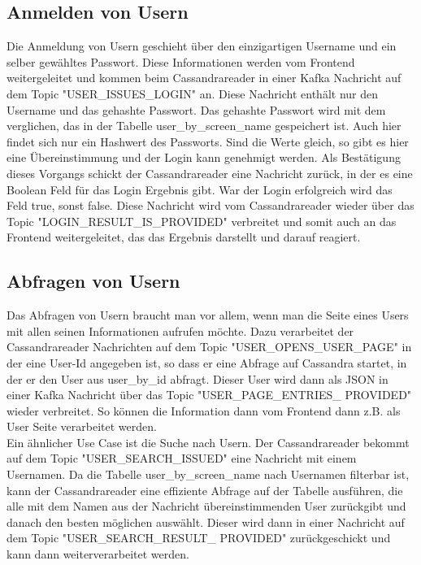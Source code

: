 \subsection{Anmelden von Usern}
Die Anmeldung von Usern geschieht über den einzigartigen Username und ein selber gewähltes Passwort. Diese Informationen werden vom Frontend weitergeleitet und kommen beim Cassandrareader in einer Kafka Nachricht auf dem Topic "USER\_ISSUES\_LOGIN" an. Diese Nachricht enthält nur den Username und das gehashte Passwort. Das gehashte Passwort wird mit dem verglichen, das in der Tabelle user\_by\_screen\_name gespeichert ist. Auch hier findet sich nur ein Hashwert des Passworts. Sind die Werte gleich, so gibt es hier eine Übereinstimmung und der Login kann genehmigt werden. Als Bestätigung dieses Vorgangs schickt der Cassandrareader eine Nachricht zurück, in der es eine Boolean Feld für das Login Ergebnis gibt. War der Login erfolgreich wird das Feld true, sonst false. Diese Nachricht wird vom Cassandrareader wieder über das Topic "LOGIN\_RESULT\_IS\_PROVIDED" verbreitet und somit auch an das Frontend weitergeleitet, das das Ergebnis darstellt und darauf reagiert.

\subsection{Abfragen von Usern}
\label{subsec:Userabfrage}
Das Abfragen von Usern braucht man vor allem, wenn man die Seite eines Users mit allen seinen Informationen aufrufen möchte. Dazu verarbeitet der Cassandrareader Nachrichten auf dem Topic "USER\_OPENS\_USER\_PAGE" in der eine User-Id angegeben ist, so dass er eine Abfrage auf Cassandra startet, in der er den User aus user\_by\_id abfragt. Dieser User wird dann als JSON in einer Kafka Nachricht über das Topic "USER\_PAGE\_ENTRIES\_ PROVIDED" wieder verbreitet. So können die Information dann vom Frontend dann z.B. als User Seite verarbeitet werden.\\
Ein ähnlicher Use Case ist die Suche nach Usern. Der Cassandrareader bekommt auf dem Topic "USER\_SEARCH\_ISSUED" eine Nachricht mit einem Usernamen. Da die Tabelle user\_by\_screen\_name nach Usernamen filterbar ist, kann der Cassandrareader eine effiziente Abfrage auf der Tabelle ausführen, die alle mit dem Namen aus der Nachricht übereinstimmenden User zurückgibt und danach den besten möglichen auswählt. Dieser wird dann in einer Nachricht auf dem Topic "USER\_SEARCH\_RESULT\_ PROVIDED" zurückgeschickt und kann dann weiterverarbeitet werden.

